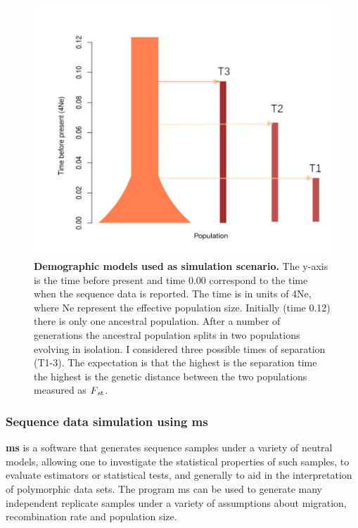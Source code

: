 \begin{figure}[H]
\centering
\includegraphics[width=1.00\textwidth]{fig/populations.png}
\decoRule
\caption{\textbf{Demographic models used as simulation scenario.} The y-axis is the time before present and time 0.00 correspond to the time when the sequence data is reported. The time is in units of 4Ne, where Ne represent the effective population size. Initially (time 0.12) there is only one ancestral population. After a number of generations the ancestral population splits in two populations evolving in isolation. I considered three possible times of separation (T1-3). The expectation is that the highest is the separation time the highest is the genetic distance between the two populations measured as $F\textsubscript{st}$.} 
\label{fig:population.pdf}
\end{figure}

\subsubsection{Sequence data simulation using \textbf{ms}}
\textbf{ms} \cite{hudson2004ms} is a software that generates sequence samples under a variety of neutral models, allowing one to investigate the statistical properties of such samples, to evaluate estimators or statistical tests, and generally to aid in the interpretation of polymorphic data sets. The program ms can be used to generate many independent replicate samples under a variety of assumptions about migration, recombination rate and population size.\\ 

